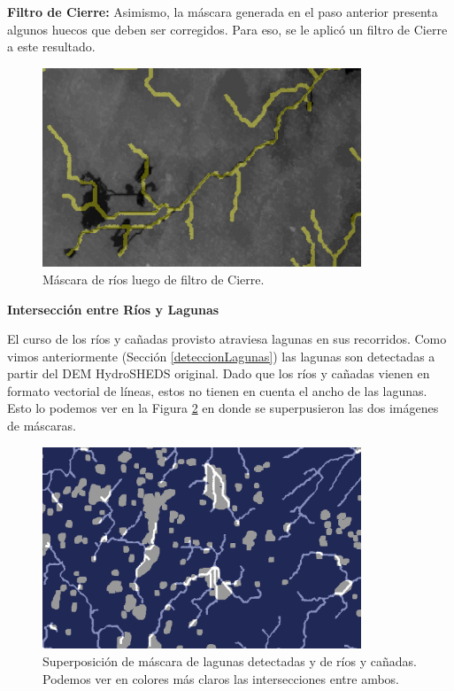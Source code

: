 \documentclass[10pt,a4paper, twoside]{report}
\begin{document}
\textbf{Filtro de Cierre:}  Asimismo, la máscara generada en el paso anterior presenta algunos huecos que deben ser corregidos. Para eso, se le aplicó un filtro de Cierre a este resultado.

\begin{figure}[H]
   \centering      
   \includegraphics[width=0.85\textwidth]{imagenes/riversEnroutedClosing.jpg}
 \caption{Máscara de ríos luego de filtro de Cierre.}
 \label{riversEnroutedClosing}
\end{figure}

\textbf{Intersección entre Ríos y Lagunas}

El curso de los ríos y cañadas provisto atraviesa lagunas en sus recorridos. Como vimos anteriormente (Sección \ref{deteccionLagunas}) las lagunas son detectadas a partir del DEM HydroSHEDS original. Dado que los ríos y cañadas vienen en formato vectorial de líneas, estos no tienen en cuenta el ancho de las lagunas. Esto lo podemos ver en la Figura \ref{lagunasSobreRios} en donde se superpusieron las dos imágenes de máscaras.

\begin{figure}[H]
   \centering      
   \includegraphics[width=0.85\textwidth]{imagenes/lagunasSobreRios.jpg}
 \caption{Superposición de máscara de lagunas detectadas y de ríos y cañadas. Podemos ver en colores más claros las intersecciones entre ambos.}
 \label{lagunasSobreRios}
\end{figure}
\end{document}
